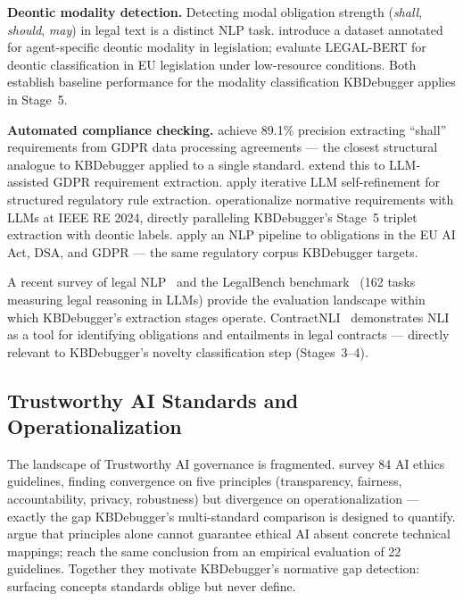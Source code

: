 \textbf{Deontic modality detection.} Detecting modal obligation strength (\emph{shall},
\emph{should}, \emph{may}) in legal text is a distinct NLP task. \citet{sakketou2022deontic}
introduce a dataset annotated for agent-specific deontic modality in legislation;
\citet{liasetsanagakis2023lowresource} evaluate LEGAL-BERT for deontic classification
in EU legislation under low-resource conditions. Both establish baseline performance for
the modality classification KBDebugger applies in Stage~5.

\textbf{Automated compliance checking.} \citet{amaral2023gdpr} achieve 89.1\% precision
extracting ``shall'' requirements from GDPR data processing agreements — the
closest structural analogue to KBDebugger applied to a single standard.
\citet{abualhaija2025llm} extend this to LLM-assisted GDPR requirement extraction.
\citet{guliani2026jure} apply iterative LLM self-refinement for structured regulatory rule
extraction. \citet{feng2024normative} operationalize normative requirements with LLMs at
IEEE RE 2024, directly paralleling KBDebugger's Stage~5 triplet extraction with deontic labels.
\citet{icail2025obligation} apply an NLP pipeline to obligations in the EU AI Act, DSA, and
GDPR — the same regulatory corpus KBDebugger targets.

A recent survey of legal NLP~\citep{ariai2024legalnlp} and the LegalBench
benchmark~\citep{guha2023legalbench} (162 tasks measuring legal reasoning in LLMs) provide
the evaluation landscape within which KBDebugger's extraction stages operate.
ContractNLI~\citep{koreeda2021contractnli} demonstrates NLI as a tool for identifying
obligations and entailments in legal contracts — directly relevant to KBDebugger's
novelty classification step (Stages~3--4).

\subsection{Trustworthy AI Standards and Operationalization}

The landscape of Trustworthy AI governance is fragmented.
\citet{jobin2019global} survey 84 AI ethics guidelines, finding convergence on five
principles (transparency, fairness, accountability, privacy, robustness) but divergence on
operationalization — exactly the gap KBDebugger's multi-standard comparison is designed to quantify.
\citet{mittelstadt2019principles} argue that principles alone cannot guarantee ethical AI
absent concrete technical mappings; \citet{hagendorff2020ethics} reach the same conclusion
from an empirical evaluation of 22 guidelines. Together they motivate KBDebugger's normative
gap detection: surfacing concepts standards oblige but never define.

